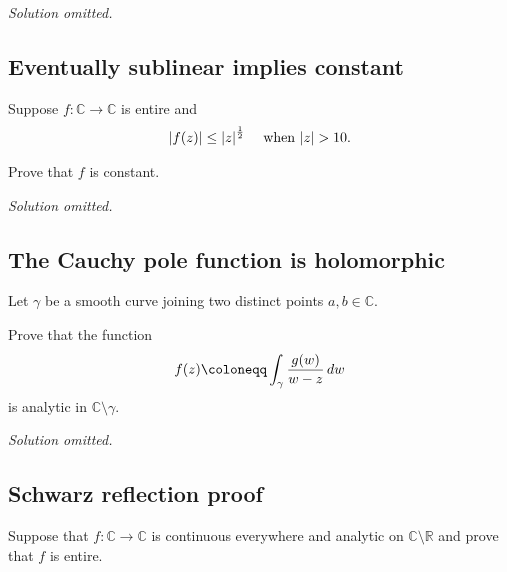 \emph{Solution omitted.}

\hypertarget{eventually-sublinear-implies-constant}{%
\subsection{Eventually sublinear implies
constant}\label{eventually-sublinear-implies-constant}}

\begin{problem}[?]

Suppose \(f: {\mathbb{C}}\to {\mathbb{C}}\) is entire and
\begin{align*}
{\left\lvert {f(z)} \right\rvert} \leq {\left\lvert {z} \right\rvert}^{1\over 2} \quad\text{ when } {\left\lvert {z} \right\rvert} > 10
.\end{align*}

Prove that \(f\) is constant.

\end{problem}

\emph{Solution omitted.}

\hypertarget{the-cauchy-pole-function-is-holomorphic}{%
\subsection{The Cauchy pole function is
holomorphic}\label{the-cauchy-pole-function-is-holomorphic}}

\begin{problem}[?]

Let \(\gamma\) be a smooth curve joining two distinct points
\(a, b\in {\mathbb{C}}\).

Prove that the function
\begin{align*}
f(z) \coloneqq\int_\gamma {g(w) \over w-z} \,dw
\end{align*}
is analytic in \({\mathbb{C}}\setminus\gamma\).

\end{problem}

\emph{Solution omitted.}

\hypertarget{schwarz-reflection-proof}{%
\subsection{Schwarz reflection proof}\label{schwarz-reflection-proof}}

\begin{problem}[?]

Suppose that \(f: {\mathbb{C}}\to{\mathbb{C}}\) is continuous everywhere
and analytic on \({\mathbb{C}}\setminus {\mathbb{R}}\) and prove that
\(f\) is entire.

\end{problem}

